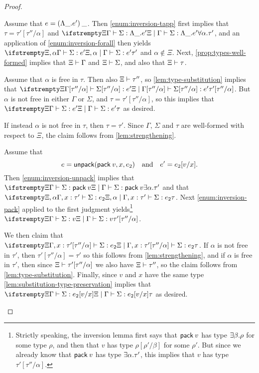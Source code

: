 \begin{proof}
\begin{proofsec}
    \item[\ruleref{Etapptlam}]
    Assume that $e = \expTapp{\expForall*{\alpha}{e'}}{\alpha}$. Then \cref{enum:inversion-tapp} first implies that $\tau = \tau'[\tau''/\alpha]$ and $\typerel{\Xi}{\Gamma}{\Sigma}{\expForall{\alpha}{e'}}{\typeForall{\alpha}{\tau'}}$, and an application of \cref{enum:inversion-forall} then yields $\typerel{\Xi,\alpha}{\Gamma}{\Sigma}{e'}{\tau'}$ and $\alpha \not\in \Xi$. Next, \cref{prop:types-well-formed} implies that $\Xi \vdash \Gamma$ and $\Xi \vdash \Sigma$, and also that $\Xi \vdash \tau$.
    
    Assume that $\alpha$ is free in $\tau$. Then also $\Xi \vdash \tau''$, so \cref{lem:type-substitution} implies that $\typerel{\Xi}{\Gamma[\tau''/\alpha]}{\Sigma[\tau''/\alpha]}{e'}{\tau'[\tau''/\alpha]}$. But $\alpha$ is not free in either $\Gamma$ or $\Sigma$, and $\tau = \tau'[\tau''/\alpha]$, so this implies that $\typerel{\Xi}{\Gamma}{\Sigma}{e'}{\tau}$ as desired.

    If instead $\alpha$ is not free in $\tau$, then $\tau = \tau'$. Since $\Gamma$, $\Sigma$ and $\tau$ are well-formed with respect to $\Xi$, the claim follows from \cref{lem:strengthening}.

    \item[\ruleref{Eunpackpack}]
    Assume that
    \begin{equation*}
        e = \expUnpack{\expPack{v}}{x}{e_2}
        \quad \text{and} \quad
        e' = e_2[v/x].
    \end{equation*}
    Then \cref{enum:inversion-unpack} implies that $\typerel{\Xi}{\Gamma}{\Sigma}{\expPack{v}}{\typeExists{\alpha}{\tau'}}$ and that $\typerel{\Xi,\alpha}{\Gamma, \hastype{x}{\tau'}}{\Sigma}{e_2}{\tau}$. Next \cref{enum:inversion-pack} applied to the first judgment yields\footnote{Strictly speaking, the inversion lemma first says that $\expPack{v}$ has type $\typeExists{\beta}{\rho}$ for some type $\rho$, and then that $v$ has type $\rho[\rho'/\beta]$ for some $\rho'$. But since we already know that $\expPack{v}$ has type $\typeExists{\alpha}{\tau'}$, this implies that $v$ has type $\tau'[\tau''/\alpha]$.} $\typerel{\Xi}{\Gamma}{\Sigma}{v}{\tau'[\tau''/\alpha]}$.
    
    We then claim that $\typerel{\Xi}{\Gamma, \hastype{x}{\tau'[\tau''/\alpha]}}{\Sigma}{e_2}{\tau}$. If $\alpha$ is not free in $\tau'$, then $\tau'[\tau''/\alpha] = \tau'$ so this follows from \cref{lem:strengthening}, and if $\alpha$ is free in $\tau'$, then since $\Xi \vdash \tau'[\tau''/\alpha]$ we also have $\Xi \vdash \tau''$, so the claim follows from \cref{lem:type-substitution}. Finally, since $v$ and $x$ have the same type \cref{lem:substitution-type-preservation} implies that $\typerel{\Xi}{\Gamma}{\Sigma}{e_2[v/x]}{\tau}$ as desired.


\end{proofsec}
\end{proof}
